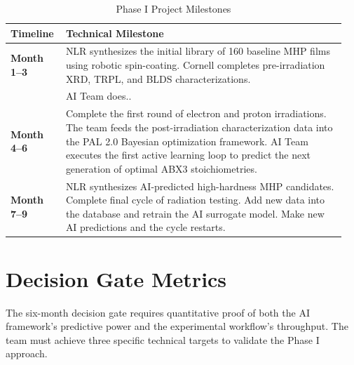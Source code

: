 \documentclass[pgs]{DOE}
\newcommand{\mnote}[1]{{\marginpar{\color{red} #1}}}
\newcommand{\myclearpage}{\clearpage}
\begin{document}
\begin{table}[h]
\centering
\caption{Phase I Project Milestones}
\renewcommand{\arraystretch}{1.3}
\begin{tabular}{p{0.15\linewidth}p{0.8\linewidth}}
\hline
\textbf{Timeline} & \textbf{Technical Milestone} \\
\hline
\textbf{Month 1--3} & NLR synthesizes the initial library of 160 baseline MHP films using robotic spin-coating. Cornell completes pre-irradiation XRD, TRPL, and BLDS characterizations. \\
& AI Team does.. \\
\hline
\textbf{Month 4--6} & Complete the first round of electron and proton irradiations. The team feeds the post-irradiation characterization data into the PAL 2.0 Bayesian optimization framework. AI Team executes the first active learning loop to predict the next generation of optimal ABX3 stoichiometries. \\
\hline
\textbf{Month 7--9} & NLR synthesizes AI-predicted high-hardness MHP candidates. Complete final cycle of radiation testing. Add new data into the database and retrain the AI surrogate model. Make new AI predictions and the cycle restarts. \\
\hline
\end{tabular}
\end{table}




\myclearpage
\section{Decision Gate Metrics}
\mnote{0.5 page}
%
 

The six-month decision gate requires quantitative proof of both the AI framework's predictive power and the experimental workflow's throughput. The team must achieve three specific technical targets to validate the Phase I approach.
\end{document}
